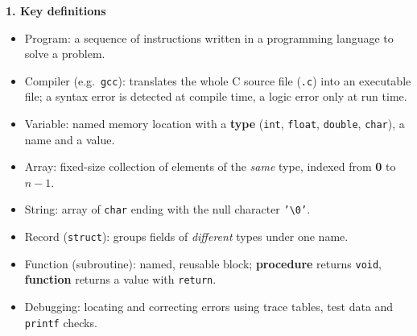\documentclass[11pt]{article}
\newcommand{\cle}[1]{{\popxbold\color{popdark}#1}}
\begin{document}
\begin{bilan}
\textbf{1. Key definitions}
\begin{itemize}
\item \cle{Program}: a sequence of instructions written in a programming language to solve a problem.
\item \cle{Compiler} (e.g.\ \texttt{gcc}): translates the whole C source file (\texttt{.c}) into an executable file; a \cle{syntax error} is detected at compile time, a \cle{logic error} only at run time.
\item \cle{Variable}: named memory location with a \textbf{type} (\texttt{int}, \texttt{float}, \texttt{double}, \texttt{char}), a name and a value.
\item \cle{Array}: fixed-size collection of elements of the \emph{same} type, indexed from \textbf{0} to $n-1$.
\item \cle{String}: array of \texttt{char} ending with the null character \texttt{'\textbackslash0'}.
\item \cle{Record} (\texttt{struct}): groups fields of \emph{different} types under one name.
\item \cle{Function} (subroutine): named, reusable block; \textbf{procedure} returns \texttt{void}, \textbf{function} returns a value with \texttt{return}.
\item \cle{Debugging}: locating and correcting errors using trace tables, test data and \texttt{printf} checks.
\end{itemize}


\end{bilan}
\end{document}
